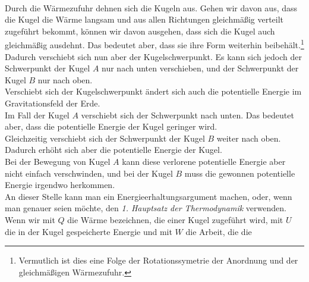 \begin{Answer}
	\begin{figure}[h]
		\centering
	\end{figure}\\
	Durch die Wärmezufuhr dehnen sich die Kugeln aus. Gehen wir davon aus, dass die Kugel die Wärme langsam und aus allen Richtungen gleichmäßig verteilt zugeführt bekommt, können wir davon ausgehen, dass sich die Kugel auch gleichmäßig ausdehnt. Das bedeutet aber, dass sie ihre Form weiterhin beibehält.\footnote[2]{Vermutlich ist dies eine Folge der Rotationssymetrie der Anordnung und der gleichmäßigen Wärmezufuhr.}
	Dadurch verschiebt sich nun aber der Kugelschwerpunkt. Es kann sich jedoch der Schwerpunkt der Kugel $A$ nur nach unten verschieben, und der Schwerpunkt der Kugel $B$ nur nach oben. \\
	Verschiebt sich der Kugelschwerpunkt ändert sich auch die potentielle Energie im Gravitationsfeld der Erde. \\
	Im Fall der Kugel $A$ verschiebt sich der Schwerpunkt nach unten. Das bedeutet aber, dass die potentielle Energie der Kugel geringer wird. \\
	Gleichzeitig verschiebt sich der Schwerpunkt der Kugel $B$ weiter nach oben. Dadurch erhöht sich aber die potentielle Energie der Kugel. \\
	Bei der Bewegung von Kugel $A$ kann diese \glqq verlorene\grqq{} potentielle Energie aber nicht einfach verschwinden, und bei der Kugel $B$ muss die \glqq gewonnen\grqq{} potentielle Energie irgendwo herkommen. \\
	An dieser Stelle kann man ein Energieerhaltungsargument machen, oder, wenn man genauer seien möchte, den \textit{1. Hauptsatz der Thermodynamik} verwenden. Wenn wir mit $Q$ die Wärme bezeichnen, die einer Kugel zugeführt wird, mit $U$ die in der Kugel gespeicherte Energie und mit $W$ die Arbeit, die die
\end{Answer}
